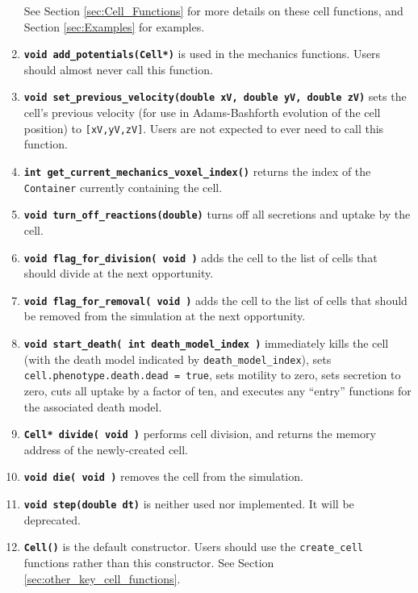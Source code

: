 \documentclass[12pt]{article}
\renewcommand{\v}{\verb}
\newcommand{\smallcode}[1]{\textbf{\texttt{#1}}}
\begin{document}
\begin{enumerate}
See Section \ref{sec:Cell_Functions} for more details on these 
cell functions, and Section \ref{sec:Examples} for examples. 

\item 
\smallcode{void add\_potentials(Cell*)} is used in the mechanics functions. 
Users should almost never call this function. 

\item 
\smallcode{void set\_previous\_velocity(double xV, double yV, double zV)} 
sets the cell's previous velocity (for use in Adams-Bashforth evolution 
of the cell position) to \v|[xV,yV,zV]|. 
Users are not expected to ever need to call this 
function. 

\item 
\smallcode{int get\_current\_mechanics\_voxel\_index()} returns the 
index of the \v|Container| currently containing the cell. 

\item 
\smallcode{void turn\_off\_reactions(double)} turns off all 
secretions and uptake by the cell. 

\item   
\smallcode{void flag\_for\_division( void )} adds the cell to the 
list of cells that should divide at the next opportunity. 

\item 
\smallcode{void flag\_for\_removal( void )} adds the cell to the 
list of cells that should be removed from the simulation 
at the next opportunity. 

\item
\smallcode{void start\_death( int death\_model\_index )} immediately 
kills the cell (with the death model indicated by 
\v|death_model_index|), sets \v|cell.phenotype.death.dead = true|, sets 
motility to zero, sets secretion to zero, cuts all uptake by a factor 
of ten, and executes any ``entry'' functions for the associated 
death model. 

\item 
\smallcode{Cell* divide( void )} performs cell division, and returns 
the memory address of the newly-created cell. 

\item 
\smallcode{void die( void )} removes the cell from the simulation. 

\item 
\smallcode{void step(double dt)} is neither used nor implemented. It will 
be deprecated. 

\item 
\smallcode{Cell()} is the default constructor. Users should 
use the \v|create_cell| functions rather than this constructor. 
See Section \ref{sec:other_key_cell_functions}. 


\end{enumerate}
\end{document}
